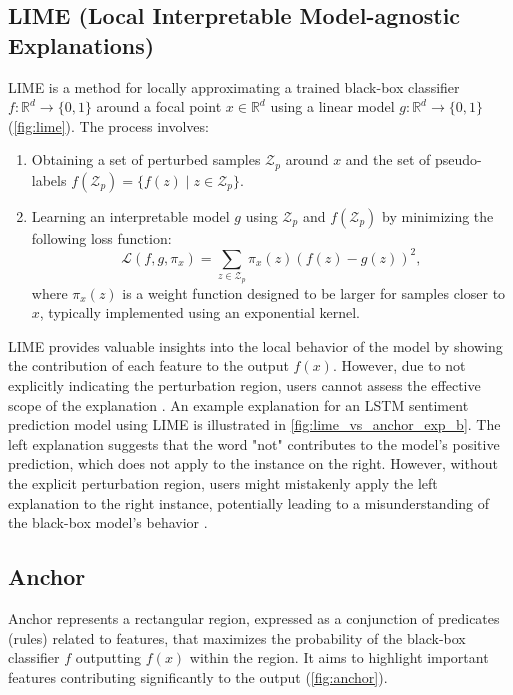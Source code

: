 \documentclass[runningheads]{llncs}
\begin{document}
\subsection{LIME (Local Interpretable Model-agnostic Explanations) \cite{ribeiro2016why}}
LIME is a method for locally approximating a trained black-box classifier $f: \mathbb{R}^d \to \{0,1\}$ around a focal point $x \in \mathbb{R}^d$ using a linear model $g: \mathbb{R}^d \to \{0,1\}$ (\cref{fig:lime}). The process involves:
\begin{enumerate}
  \item Obtaining a set of perturbed samples $\mathcal{Z}_p$ around $x$ and the set of pseudo-labels $f(\mathcal{Z}_p) = \{f(z) \mid z \in \mathcal{Z}_p\}$.
  \item Learning an interpretable model $g$ using $\mathcal{Z}_p$ and $f(\mathcal{Z}_p)$ by minimizing the following loss function:
        \begin{equation}
          \label{eq:lime_loss}
          \mathcal{L}(f,g,\pi_x)=\sum_{z\in\mathcal{Z}_p}
          \pi_x(z){\left(f(z)-g(z)\right)}^2,
        \end{equation}
        where $\pi_x(z)$ is a weight function designed to be larger for samples closer to $x$, typically implemented using an exponential kernel.
\end{enumerate}

LIME provides valuable insights into the local behavior of the model by showing the contribution of each feature to the output $f(x)$. However, due to not explicitly indicating the perturbation region, users cannot assess the effective scope of the explanation \cite{ribeiro2018anchors}. An example explanation for an LSTM sentiment prediction model using LIME is illustrated in \cref{fig:lime_vs_anchor_exp_b}. The left explanation suggests that the word "not" contributes to the model's positive prediction, which does not apply to the instance on the right. However, without the explicit perturbation region, users might mistakenly apply the left explanation to the right instance, potentially leading to a misunderstanding of the black-box model's behavior \cite{ribeiro2018anchors}.

\subsection{Anchor \cite{ribeiro2018anchors}}\label{sec:anchor}
Anchor represents a rectangular region, expressed as a conjunction of predicates (rules) related to features, that maximizes the probability of the black-box classifier $f$ outputting $f(x)$ within the region. It aims to highlight important features contributing significantly to the output (\cref{fig:anchor}).
\end{document}
